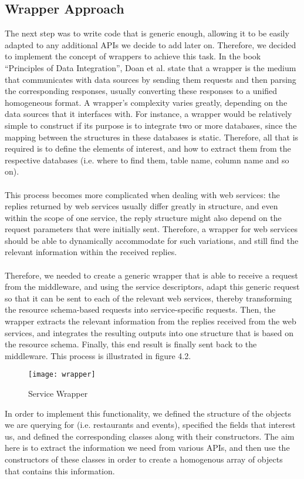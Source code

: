 \subsection{Wrapper Approach}
The next step was to write code that is generic enough, allowing it to be easily adapted to any additional APIs we decide to add later on. Therefore, we decided to implement the concept of wrappers to achieve this task. In the book ``Principles of Data Integration'', Doan et al.\cite{doan} state that a wrapper is the medium that communicates with data sources by sending them requests and then parsing the corresponding responses, usually converting these responses to a unified homogeneous format. A wrapper's complexity varies greatly, depending on the data sources that it interfaces with. For instance, a wrapper would be relatively simple to construct if its purpose is to integrate two or more databases, since the mapping between the structures in these databases is static. Therefore, all that is required is to define the elements of interest, and how to extract them from the respective databases (i.e. where to find them, table name, column name and so on).\\\\
This process becomes more complicated when dealing with web services: the replies returned by web services usually differ greatly in structure, and even within the scope of one service, the reply structure might also depend on the request parameters that were initially sent. Therefore, a wrapper for web services should be able to dynamically accommodate for such variations, and still find the relevant information within the received replies.\\\\
Therefore, we needed to create a generic wrapper that is able to receive a request from the middleware, and using the service descriptors, adapt this generic request so that it can be sent to each of the relevant web services, thereby transforming the resource schema-based requests into service-specific requests. Then, the wrapper extracts the relevant information from the replies received from the web services, and integrates the resulting outputs into one structure that is based on the resource schema. Finally, this end result is finally sent back to the middleware. This process is illustrated in figure 4.2.
\begin{figure}[h]
\centering
\texttt{[image: wrapper]}
\caption{Service Wrapper}
\end{figure}
\newpage
\noindent In order to implement this functionality, we defined the structure of the objects we are querying for (i.e. restaurants and events), specified the fields that interest us, and defined the corresponding classes along with their constructors. The aim here is to extract the information we need from various APIs, and then use the constructors of these classes in order to create a homogenous array of objects that contains this information.\\\\
